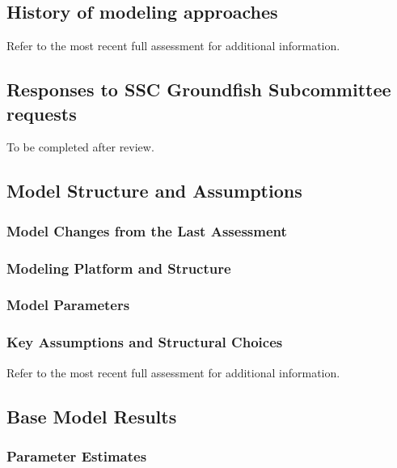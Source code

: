 \documentclass[
]{scrartcl}
\begin{document}
\subsection{History of modeling
approaches}\label{history-of-modeling-approaches}

Refer to the most recent full assessment for additional information.

\subsection{Responses to SSC Groundfish Subcommittee
requests}\label{responses-to-ssc-groundfish-subcommittee-requests}

To be completed after review.

\subsection{Model Structure and
Assumptions}\label{model-structure-and-assumptions}

\subsubsection{Model Changes from the Last
Assessment}\label{model-changes-from-the-last-assessment}

\subsubsection{Modeling Platform and
Structure}\label{modeling-platform-and-structure}

\subsubsection{Model Parameters}\label{model-parameters}

\subsubsection{Key Assumptions and Structural
Choices}\label{key-assumptions-and-structural-choices}

Refer to the most recent full assessment for additional information.

\subsection{Base Model Results}\label{base-model-results}

\subsubsection{Parameter Estimates}\label{parameter-estimates}
\end{document}
